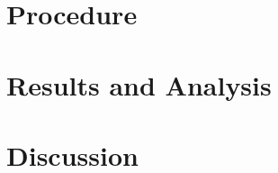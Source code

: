 \documentclass{article}
\begin{document}
	\section{Procedure}
	\section{Results and Analysis}
	
	\section{Discussion}
	
\end{document}
